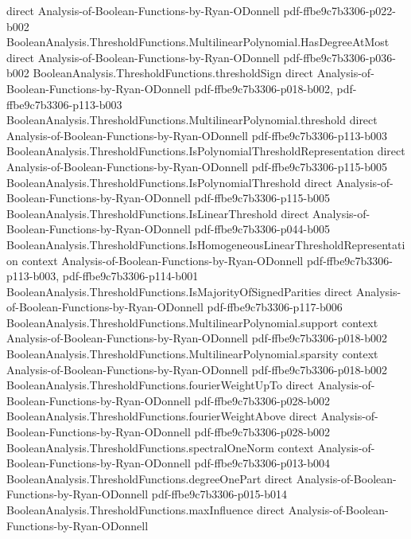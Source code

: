 \begin{theorem}
  {direct}
  {Analysis-of-Boolean-Functions-by-Ryan-ODonnell}
  {pdf-ffbe9c7b3306-p022-b002}
\proofstep
  {BooleanAnalysis.ThresholdFunctions.MultilinearPolynomial.HasDegreeAtMost}
  {direct}
  {Analysis-of-Boolean-Functions-by-Ryan-ODonnell}
  {pdf-ffbe9c7b3306-p036-b002}
\proofstep
  {BooleanAnalysis.ThresholdFunctions.thresholdSign}
  {direct}
  {Analysis-of-Boolean-Functions-by-Ryan-ODonnell}
  {pdf-ffbe9c7b3306-p018-b002,
    pdf-ffbe9c7b3306-p113-b003}
\proofstep
  {BooleanAnalysis.ThresholdFunctions.MultilinearPolynomial.threshold}
  {direct}
  {Analysis-of-Boolean-Functions-by-Ryan-ODonnell}
  {pdf-ffbe9c7b3306-p113-b003}
\proofstep
  {BooleanAnalysis.ThresholdFunctions.IsPolynomialThresholdRepresentation}
  {direct}
  {Analysis-of-Boolean-Functions-by-Ryan-ODonnell}
  {pdf-ffbe9c7b3306-p115-b005}
\proofstep
  {BooleanAnalysis.ThresholdFunctions.IsPolynomialThreshold}
  {direct}
  {Analysis-of-Boolean-Functions-by-Ryan-ODonnell}
  {pdf-ffbe9c7b3306-p115-b005}
\proofstep
  {BooleanAnalysis.ThresholdFunctions.IsLinearThreshold}
  {direct}
  {Analysis-of-Boolean-Functions-by-Ryan-ODonnell}
  {pdf-ffbe9c7b3306-p044-b005}
\proofstep
  {BooleanAnalysis.ThresholdFunctions.IsHomogeneousLinearThresholdRepresentation}
  {context}
  {Analysis-of-Boolean-Functions-by-Ryan-ODonnell}
  {pdf-ffbe9c7b3306-p113-b003,
    pdf-ffbe9c7b3306-p114-b001}
\proofstep
  {BooleanAnalysis.ThresholdFunctions.IsMajorityOfSignedParities}
  {direct}
  {Analysis-of-Boolean-Functions-by-Ryan-ODonnell}
  {pdf-ffbe9c7b3306-p117-b006}
\proofstep
  {BooleanAnalysis.ThresholdFunctions.MultilinearPolynomial.support}
  {context}
  {Analysis-of-Boolean-Functions-by-Ryan-ODonnell}
  {pdf-ffbe9c7b3306-p018-b002}
\proofstep
  {BooleanAnalysis.ThresholdFunctions.MultilinearPolynomial.sparsity}
  {context}
  {Analysis-of-Boolean-Functions-by-Ryan-ODonnell}
  {pdf-ffbe9c7b3306-p018-b002}
\proofstep
  {BooleanAnalysis.ThresholdFunctions.fourierWeightUpTo}
  {direct}
  {Analysis-of-Boolean-Functions-by-Ryan-ODonnell}
  {pdf-ffbe9c7b3306-p028-b002}
\proofstep
  {BooleanAnalysis.ThresholdFunctions.fourierWeightAbove}
  {direct}
  {Analysis-of-Boolean-Functions-by-Ryan-ODonnell}
  {pdf-ffbe9c7b3306-p028-b002}
\proofstep
  {BooleanAnalysis.ThresholdFunctions.spectralOneNorm}
  {context}
  {Analysis-of-Boolean-Functions-by-Ryan-ODonnell}
  {pdf-ffbe9c7b3306-p013-b004}
\proofstep
  {BooleanAnalysis.ThresholdFunctions.degreeOnePart}
  {direct}
  {Analysis-of-Boolean-Functions-by-Ryan-ODonnell}
  {pdf-ffbe9c7b3306-p015-b014}
\proofstep
  {BooleanAnalysis.ThresholdFunctions.maxInfluence}
  {direct}
  {Analysis-of-Boolean-Functions-by-Ryan-ODonnell}

\end{theorem}
